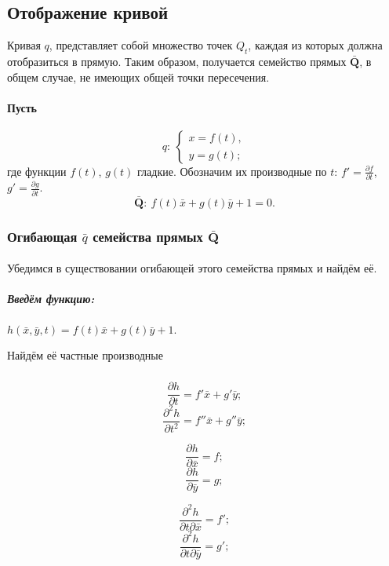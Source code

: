 \subsection{Отображение кривой}
Кривая $q$, представляет собой множество точек $Q_t$, каждая из которых должна отобразиться в прямую. Таким образом, получается семейство прямых $\bar{\mathbf{Q}}$, в общем случае, не имеющих общей точки пересечения.
\paragraph{Пусть}
$$q:\: 
\left\{
\begin{array}{l}
	x = f(t),\\
	y = g(t);
\end{array}
\right.
$$
где функции $f(t)$, $g(t)$ гладкие. Обозначим их производные по $t$: $f' = \frac{\partial f}{\partial t}$, $g' = \frac{\partial g}{\partial t}$.
$$\mathbf{\bar{Q}}:
\:
f(t)\bar{x} + g(t)\bar{y} + 1 = 0.$$
\subsubsection{Огибающая $\bar{q}$ семейства прямых $\mathbf{\bar{Q}}$}
\paragraph{}Убедимся в существовании огибающей этого семейства прямых и найдём её.
\subparagraph{Введём функцию:}
$h(\bar{x}, \bar{y}, t) = f(t)\bar{x} + g(t)\bar{y} + 1.$

Найдём её частные производные
\subparagraph{}
\begin{minipage}{0.3\textwidth}
	$$\frac{\partial h}{\partial t} = f'\bar{x} + g'\bar{y};$$
	$$\frac{\partial^2 h}{\partial t^2} = f''\bar{x} + g''\bar{y};$$
\end{minipage}
\begin{minipage}{0.3\textwidth}
	$$\frac{\partial h}{\partial\bar{x}} = f;$$
	$$\frac{\partial h}{\partial\bar{y}} = g;$$
\end{minipage}
\begin{minipage}{0.3\textwidth}
	$$\frac{\partial^2 h}{\partial t \partial\bar{x}} = f';$$
	$$\frac{\partial^2 h}{\partial t \partial\bar{y}} = g';$$
\end{minipage}

